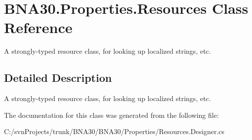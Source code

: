 \hypertarget{class_b_n_a30_1_1_properties_1_1_resources}{}\section{B\+N\+A30.\+Properties.\+Resources Class Reference}
\label{class_b_n_a30_1_1_properties_1_1_resources}


A strongly-\/typed resource class, for looking up localized strings, etc.  




\subsection{Detailed Description}
A strongly-\/typed resource class, for looking up localized strings, etc. 



The documentation for this class was generated from the following file\+:\begin{DoxyCompactItemize}
\item 
C\+:/svn\+Projects/trunk/\+B\+N\+A30/\+B\+N\+A30/\+Properties/Resources.\+Designer.\+cs\end{DoxyCompactItemize}
